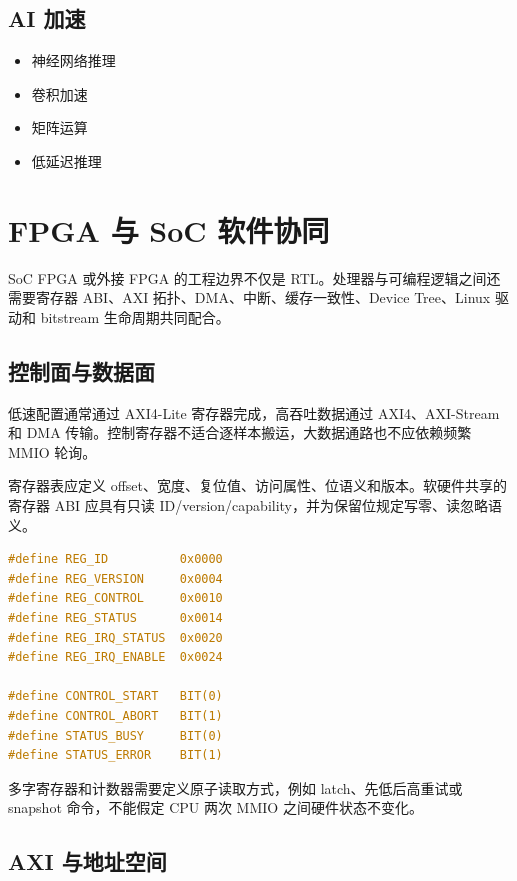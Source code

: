 \subsection{AI 加速}

\begin{itemize}
  \item 神经网络推理
  \item 卷积加速
  \item 矩阵运算
  \item 低延迟推理
\end{itemize}

\section{FPGA 与 SoC 软件协同}

SoC FPGA 或外接 FPGA 的工程边界不仅是 RTL。处理器与可编程逻辑之间还需要寄存器 ABI、AXI 拓扑、DMA、中断、缓存一致性、Device Tree、Linux 驱动和 bitstream 生命周期共同配合。

\subsection{控制面与数据面}

低速配置通常通过 AXI4-Lite 寄存器完成，高吞吐数据通过 AXI4、AXI-Stream 和 DMA 传输。控制寄存器不适合逐样本搬运，大数据通路也不应依赖频繁 MMIO 轮询。

寄存器表应定义 offset、宽度、复位值、访问属性、位语义和版本。软硬件共享的寄存器 ABI 应具有只读 ID/version/capability，并为保留位规定写零、读忽略语义。

\begin{lstlisting}[language=C,caption={FPGA 寄存器 ABI 的软件表示}]
#define REG_ID          0x0000
#define REG_VERSION     0x0004
#define REG_CONTROL     0x0010
#define REG_STATUS      0x0014
#define REG_IRQ_STATUS  0x0020
#define REG_IRQ_ENABLE  0x0024

#define CONTROL_START   BIT(0)
#define CONTROL_ABORT   BIT(1)
#define STATUS_BUSY     BIT(0)
#define STATUS_ERROR    BIT(1)
\end{lstlisting}

多字寄存器和计数器需要定义原子读取方式，例如 latch、先低后高重试或 snapshot 命令，不能假定 CPU 两次 MMIO 之间硬件状态不变化。

\subsection{AXI 与地址空间}

